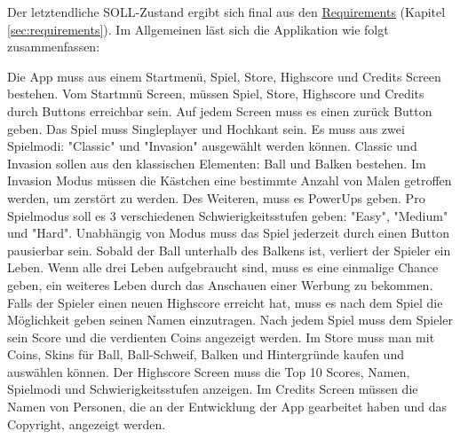 Der letztendliche SOLL-Zustand ergibt sich final aus den \hyperref[sec:requirements]{Requirements} (Kapitel \ref{sec:requirements}).
Im Allgemeinen läst sich die Applikation wie folgt zusammenfassen:

Die App muss aus einem Startmenü, Spiel, Store, Highscore und Credits Screen bestehen.
Vom Startmnü Screen, müssen Spiel, Store, Highscore und Credits durch Buttons erreichbar sein. Auf jedem Screen muss es einen zurück Button geben.
Das Spiel muss Singleplayer und Hochkant sein.
Es muss aus zwei Spielmodi: "Classic" und "Invasion" ausgewählt werden können.
Classic und Invasion sollen aus den klassischen Elementen: Ball und Balken bestehen. 
Im Invasion Modus müssen die Kästchen eine bestimmte Anzahl von Malen getroffen werden, um zerstört zu werden.
Des Weiteren, muss es PowerUps geben.
Pro Spielmodus soll es 3 verschiedenen Schwierigkeitsstufen geben: "Easy", "Medium" und "Hard".
Unabhängig von Modus muss das Spiel jederzeit durch einen Button pausierbar sein.
Sobald der Ball unterhalb des Balkens ist, verliert der Spieler ein Leben. 
Wenn alle drei Leben aufgebraucht sind, muss es eine einmalige Chance geben, ein weiteres Leben durch das Anschauen einer Werbung zu bekommen.
Falls der Spieler einen neuen Highscore erreicht hat, muss es nach dem Spiel die Möglichkeit geben seinen Namen einzutragen.
Nach jedem Spiel muss dem Spieler sein Score und die verdienten Coins angezeigt werden.
Im Store muss man mit Coins, Skins für Ball, Ball-Schweif, Balken und Hintergründe kaufen und auswählen können.
Der Highscore Screen muss die Top 10 Scores, Namen, Spielmodi und Schwierigkeitsstufen anzeigen.
Im Credits Screen müssen die Namen von Personen, die an der Entwicklung der App gearbeitet haben und das Copyright, angezeigt werden.

